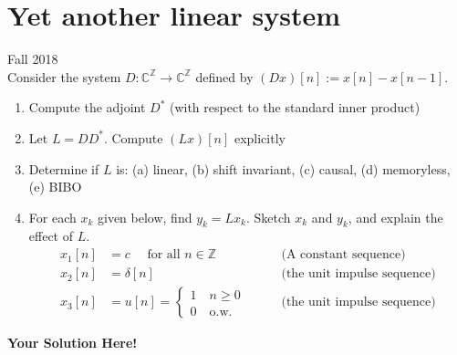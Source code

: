 \documentclass[12pt]{article}
\newcommand{\0}{\mathbf{0}}
\newcommand{\1}{\mathbf{1}}
\newcommand{\solspace}{\vspace{3mm} \textbf{Your Solution Here!} \vspace{3mm}}
\begin{document}
\rhead{\today}
 
\section{Yet another linear system}
Fall 2018\\
Consider the system $D: \mathbb{C}^{\mathbb{Z}} \rightarrow \mathbb{C}^{\mathbb{Z}}$ defined by $(D x)[n] := x[n] - x[n-1]$.
\begin{enumerate}
    \item Compute the adjoint $D^*$ (with respect to the standard inner product)
    \item Let $L = D D^*$. Compute $(Lx)[n]$ explicitly
    \item Determine if $L$ is: (a) linear, (b) shift invariant, (c) causal, (d) memoryless, (e) BIBO
    \item For each $x_k$ given below, find $y_k = L x_k$. Sketch $x_k$ and $y_k$, and explain the effect of $L$.
    \begin{align*}
        x_1[n] &= c \quad \text{ for all } n \in \mathbb{Z} \qquad &\text{(A constant sequence)} \\
        x_2[n] &= \delta[n]  \qquad &\text{(the unit impulse sequence)} \\
        x_3[n] &= u[n] = \begin{cases}
            1 \quad n\geq 0 \\
            0 \quad \text{o.w.}
        \end{cases}  \qquad &\text{(the unit impulse sequence)}
    \end{align*}
\end{enumerate}

\solspace

\pagebreak
\end{document}
